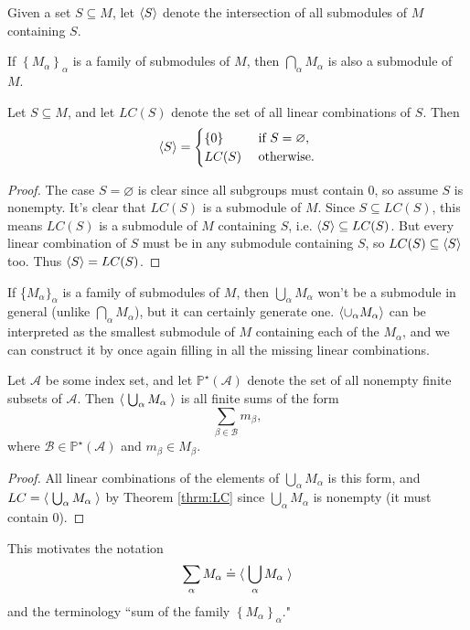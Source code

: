 \documentclass[twoside,10pt]{report}
\begin{document}
\begin{defn}[]
Given a set $S \subseteq M$, let $\langle S \rangle$ denote the intersection of all submodules of $M$ containing $S$.
\end{defn}

\begin{prop}
If $\left\{ M_{\alpha} \right\}_{\alpha}$ is a family of submodules of $M$, then $\bigcap_{\alpha}M_{\alpha}$ is also a submodule of $M$.
\end{prop}

\begin{thrm}[]
	\label{thrm:LC}
	Let $S \subseteq M$, and let $LC(S)$ denote the set of all linear combinations of $S$. Then
	\[
	\langle S \rangle=
	\begin{cases}
		\left\{ 0 \right\} & \text{ if } S = \varnothing,\\
		LC(S) & \text{ otherwise}.
	\end{cases}
	\] 
\end{thrm}
\begin{proof}
	The case $S = \varnothing$ is clear since all subgroups must contain 0, so assume $S$ is nonempty. It's clear that $LC(S)$ is a submodule of $M$. Since $S \subseteq LC(S)$, this means $LC(S)$ is a submodule of $M$ containing $S$, i.e. $\langle S \rangle \subseteq LC(S)$. But every linear combination of $S$ must be in any submodule containing $S$, so $LC(S) \subseteq \langle S \rangle$ too. Thus $\langle S \rangle= LC(S)$.
\end{proof}

If \{$M_{\alpha}\}_{\alpha}$ is a family of submodules of $M$, then $\bigcup_{\alpha}M_{\alpha}$ won't be a submodule in general (unlike $\bigcap_{\alpha}M_\alpha$), but it can certainly generate one. $\langle \cup_{\alpha}M_{\alpha} \rangle$ can be interpreted as the smallest submodule of $M$ containing each of the $M_{\alpha}$, and we can construct it by once again filling in all the missing linear combinations. 

\begin{prop}
	Let $\mathcal{A}$ be some index set, and let $\mathbb{P}^{\star}(\mathcal{A})$ denote the set of all nonempty finite subsets of $\mathcal{A}$. Then $\left\langle \;\bigcup_{\alpha}M_{\alpha}\; \right\rangle$ is all finite sums of the form
	\[
	\sum_{\beta \in \mathcal{B}} m_{\beta},
	\] where $\mathcal{B} \in \mathbb{P}^{\star}(\mathcal{A})$ and $m_{\beta} \in M_{\beta}$.
\end{prop}
\begin{proof}
	All linear combinations of the elements of $\bigcup_{\alpha}M_{\alpha}$ is this form, and $LC = \left\langle \;\bigcup_{\alpha}M_{\alpha}\; \right\rangle$ by Theorem \ref{thrm:LC} since $\bigcup_{\alpha}M_{\alpha}$ is nonempty (it must contain 0).
\end{proof}
This motivates the notation
\[
\sum_{\alpha}M_{\alpha} \doteq \langle \; \bigcup_{\alpha}M_{\alpha}\; \rangle
\] 
and the terminology ``sum of the family $\left\{ M_{\alpha} \right\}_{\alpha}$."
\end{document}
